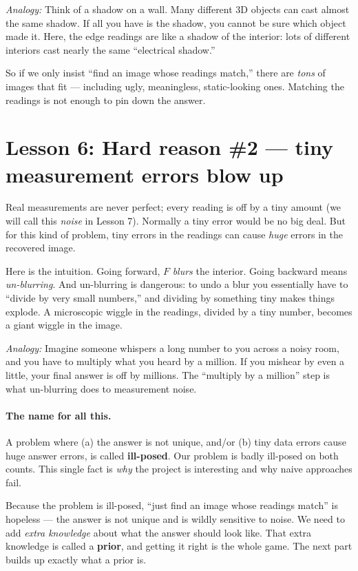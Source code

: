 \documentclass[11pt]{article}
\newcommand{\analogy}[1]{\par\smallskip\noindent\textit{Analogy:} #1\par\smallskip}
\begin{document}
\analogy{Think of a shadow on a wall. Many different 3D objects can cast
almost the same shadow. If all you have is the shadow, you cannot be sure
which object made it. Here, the edge readings are like a shadow of the
interior: lots of different interiors cast nearly the same ``electrical
shadow.''}

So if we only insist ``find an image whose readings match,'' there are
\emph{tons} of images that fit --- including ugly, meaningless, static-looking
ones. Matching the readings is not enough to pin down the answer.

\section{Lesson 6: Hard reason \#2 --- tiny measurement errors blow up}

Real measurements are never perfect; every reading is off by a tiny amount
(we will call this \emph{noise} in Lesson 7). Normally a tiny error would be
no big deal. But for this kind of problem, tiny errors in the readings can
cause \emph{huge} errors in the recovered image.

Here is the intuition. Going forward, $F$ \emph{blurs} the interior. Going
backward means \emph{un-blurring}. And un-blurring is dangerous: to undo a
blur you essentially have to ``divide by very small numbers,'' and dividing by
something tiny makes things explode. A microscopic wiggle in the readings,
divided by a tiny number, becomes a giant wiggle in the image.

\analogy{Imagine someone whispers a long number to you across a noisy room,
and you have to multiply what you heard by a million. If you mishear by even a
little, your final answer is off by millions. The ``multiply by a million''
step is what un-blurring does to measurement noise.}

\paragraph{The name for all this.} A problem where (a) the answer is not
unique, and/or (b) tiny data errors cause huge answer errors, is called
\textbf{ill-posed}. Our problem is badly ill-posed on both counts. This single
fact is \emph{why} the project is interesting and why naive approaches fail.

\begin{key}
Because the problem is ill-posed, ``just find an image whose readings match''
is hopeless --- the answer is not unique and is wildly sensitive to noise. We
need to add \emph{extra knowledge} about what the answer should look like.
That extra knowledge is called a \textbf{prior}, and getting it right is the
whole game. The next part builds up exactly what a prior is.
\end{key}
\end{document}
